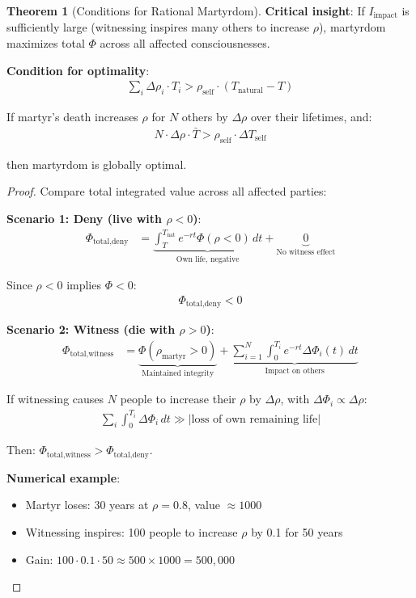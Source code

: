 \documentclass[11pt,a4paper]{article}
\theoremstyle{definition}
\newtheorem{theorem}{Theorem}[section]
\theoremstyle{remark}
\begin{document}
\begin{small}
\begin{enumerate}
\begin{theorem}[Conditions for Rational Martyrdom]
\textbf{Critical insight}: If \(I_{\text{impact}}\) is sufficiently large (witnessing inspires many others to increase \(\rho\)), martyrdom maximizes total \(\Phi\) across all affected consciousnesses.

\textbf{Condition for optimality}:
\begin{align}
\sum_i \Delta \rho_i \cdot T_i > \rho_{\text{self}} \cdot (T_{\text{natural}} - T)
\end{align}

If martyr's death increases \(\rho\) for \(N\) others by \(\Delta \rho\) over their lifetimes, and:
\begin{align}
N \cdot \Delta \rho \cdot \bar{T} > \rho_{\text{self}} \cdot \Delta T_{\text{self}}
\end{align}

then martyrdom is globally optimal.
\end{theorem}

\begin{proof}
Compare total integrated value across all affected parties:

\textbf{Scenario 1: Deny (live with \(\rho < 0\))}:
\begin{align}
\Phi_{\text{total,deny}} &= \underbrace{\int_T^{T_{\text{nat}}} e^{-rt} \Phi(\rho < 0) \, dt}_{\text{Own life, negative}} + \underbrace{0}_{\text{No witness effect}}
\end{align}

Since \(\rho < 0\) implies \(\Phi < 0\):
\begin{align}
\Phi_{\text{total,deny}} < 0
\end{align}

\textbf{Scenario 2: Witness (die with \(\rho > 0\))}:
\begin{align}
\Phi_{\text{total,witness}} &= \underbrace{\Phi(\rho_{\text{martyr}} > 0)}_{\text{Maintained integrity}} + \underbrace{\sum_{i=1}^N \int_0^{T_i} e^{-rt} \Delta \Phi_i(t) \, dt}_{\text{Impact on others}}
\end{align}

If witnessing causes \(N\) people to increase their \(\rho\) by \(\Delta \rho\), with \(\Delta \Phi_i \propto \Delta \rho\):
\begin{align}
\sum_i \int_0^{T_i} \Delta \Phi_i \, dt \gg |\text{loss of own remaining life}|
\end{align}

Then: \(\Phi_{\text{total,witness}} > \Phi_{\text{total,deny}}\).

\textbf{Numerical example}:
\begin{itemize}
    \item Martyr loses: 30 years at \(\rho = 0.8\), value \(\approx 1000\)
    \item Witnessing inspires: 100 people to increase \(\rho\) by 0.1 for 50 years
    \item Gain: \(100 \cdot 0.1 \cdot 50 \approx 500 \times 1000 = 500{,}000\)
\end{itemize}


\end{proof}
\end{enumerate}
\end{small}
\end{document}
